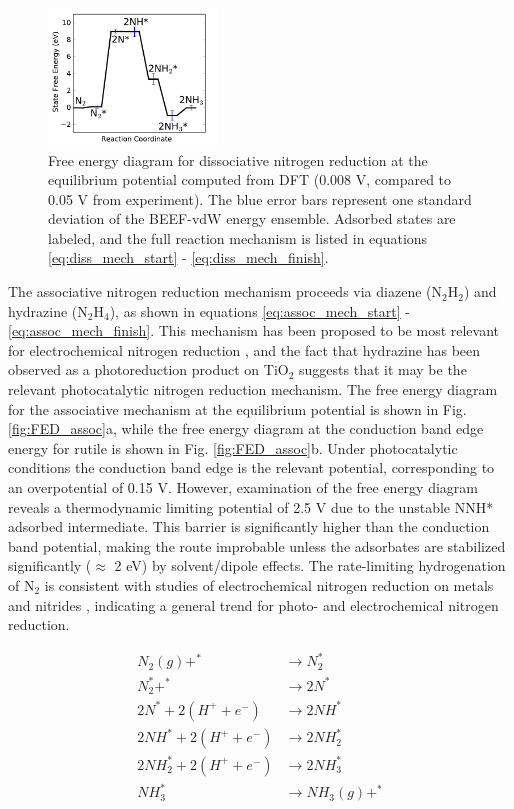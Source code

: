 \documentclass[journal=ascecg,manuscript=article,articletitle=true]{achemso}
\begin{document}
\begin{figure}
\includegraphics[width=0.4\textwidth]{figures/dissociative_path_edited.pdf}
\caption{Free energy diagram for dissociative nitrogen reduction at the equilibrium potential computed from DFT (0.008 V, compared to 0.05 V from experiment). The blue error bars represent one standard deviation of the BEEF-vdW energy ensemble. Adsorbed states are labeled, and the full reaction mechanism is listed in equations \ref{eq:diss_mech_start} - \ref{eq:diss_mech_finish}.}
\label{fig:reaction_mechanism_diss}
\end{figure}

The associative nitrogen reduction mechanism proceeds via diazene (N$_2$H$_2$) and hydrazine (N$_2$H$_4$), as shown in equations \ref{eq:assoc_mech_start} - \ref{eq:assoc_mech_finish}. This mechanism has been proposed to be most relevant for electrochemical nitrogen reduction \cite{Skulason_2012,van_der_Ham_2014}, and the fact that hydrazine has been observed as a photoreduction product on TiO$_2$ \cite{Schrauzer_2011} suggests that it may be the relevant photocatalytic nitrogen reduction mechanism. The free energy diagram for the associative mechanism at the equilibrium potential is shown in Fig. \ref{fig:FED_assoc}a, while the free energy diagram at the conduction band edge energy for rutile is shown in Fig. \ref{fig:FED_assoc}b. Under photocatalytic conditions the conduction band edge is the relevant potential, corresponding to an overpotential of 0.15 V. However, examination of the free energy diagram reveals a thermodynamic limiting potential of 2.5 V due to the unstable NNH* adsorbed intermediate. This barrier is significantly higher than the conduction band potential, making the route improbable unless the adsorbates are stabilized significantly ($\approx$ 2 eV) by solvent/dipole effects. The rate-limiting hydrogenation of N$_2$ is consistent with studies of electrochemical nitrogen reduction on metals \cite{Skulason_2012} and nitrides \cite{Abghoui_2016}, indicating a general trend for photo- and electrochemical nitrogen reduction.

\begin{align}
	\label{eq:assoc_mech_start}
	N_2(g)+^*  & \rightarrow N_2^{*} \\
    N_2^* + ^*  & \rightarrow 2N^*\\
    2N^* + 2(H^+ + e^-) & \rightarrow 2NH^* \\
    2NH^* + 2(H^+ + e^-) & \rightarrow 2NH_2^* \\
    2NH_2^* + 2(H^+ + e^-) & \rightarrow 2NH_3^* \\
    NH_3^*  & \rightarrow NH_3(g) + ^{*}
    \label{eq:assoc_mech_finish}
\end{align}
\end{document}
